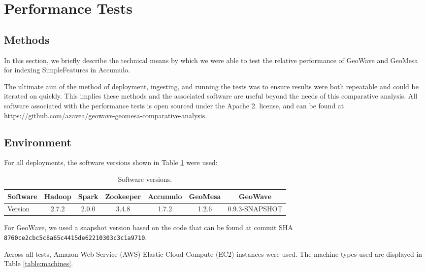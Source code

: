 \section{Performance Tests}
\label{sec:performance}


\subsection{Methods}
\label{sec:performance:methods}

In this section, we briefly describe the technical means by which we were able to test the relative performance of GeoWave and GeoMesa for indexing SimpleFeatures in Accumulo.

The ultimate aim of the method of deployment, ingesting, and running the tests was to ensure results were both repeatable and could be iterated on quickly.
This implies these methods and the associated software are useful beyond the needs of this comparative analysis.
All software associated with the performance tests is open sourced under the Apache 2.
license, and can be found at \url{https://github.com/azavea/geowave-geomesa-comparative-analysis}.


\subsection{Environment}
\label{sec:performance:environment}

For all deployments, the software versions shown in Table \ref{table:software} were used:

\begin{table}[h!tb]
  \centering
  \begin{tabular}{ | l || c | c | c | c | c | c | }
    \hline
    Software & Hadoop & Spark & Zookeeper & Accumulo & GeoMesa & GeoWave \\ \hline
    Version  & 2.7.2  & 2.0.0 & 3.4.8 & 1.7.2 & 1.2.6 & 0.9.3-SNAPSHOT \\
    \hline
  \end{tabular}
  \caption{Software versions.}
  \label{table:software}
\end{table}

For GeoWave, we used a snapshot version based on the code that can be found at commit SHA \texttt{8760ce2cbc5c8a65c4415de62210303c3c1a9710}.

Across all tests, Amazon Web Service (AWS) Elastic Cloud Compute (EC2) instances were used.
The machine types used are displayed in Table \ref{table:machines}.

